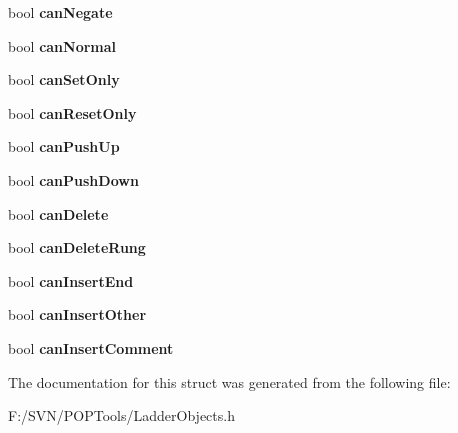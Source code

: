 \begin{DoxyCompactItemize}
\item 
\hypertarget{struct_ladder_context_aecede7dbc285e32120548c687ee4754b}{bool {\bfseries can\-Negate}}\label{struct_ladder_context_aecede7dbc285e32120548c687ee4754b}

\item 
\hypertarget{struct_ladder_context_a4fd95b615aab13842309a6d78422618d}{bool {\bfseries can\-Normal}}\label{struct_ladder_context_a4fd95b615aab13842309a6d78422618d}

\item 
\hypertarget{struct_ladder_context_a61ba9d2b55247b59fec2851dbceff11d}{bool {\bfseries can\-Set\-Only}}\label{struct_ladder_context_a61ba9d2b55247b59fec2851dbceff11d}

\item 
\hypertarget{struct_ladder_context_aaeda31d47fbcfb8c144e71c5dcc721e6}{bool {\bfseries can\-Reset\-Only}}\label{struct_ladder_context_aaeda31d47fbcfb8c144e71c5dcc721e6}

\item 
\hypertarget{struct_ladder_context_af8729a23430774a03c7c4be3aaacad68}{bool {\bfseries can\-Push\-Up}}\label{struct_ladder_context_af8729a23430774a03c7c4be3aaacad68}

\item 
\hypertarget{struct_ladder_context_a340a738f533cb7e24180bbd762c57239}{bool {\bfseries can\-Push\-Down}}\label{struct_ladder_context_a340a738f533cb7e24180bbd762c57239}

\item 
\hypertarget{struct_ladder_context_a32ac15238228f4ede02f7b07c83eb83e}{bool {\bfseries can\-Delete}}\label{struct_ladder_context_a32ac15238228f4ede02f7b07c83eb83e}

\item 
\hypertarget{struct_ladder_context_ab8d097fa1a3afa4b24264e4b5f682bdc}{bool {\bfseries can\-Delete\-Rung}}\label{struct_ladder_context_ab8d097fa1a3afa4b24264e4b5f682bdc}

\item 
\hypertarget{struct_ladder_context_a430ac7b219ae5df9630a3cb98750b943}{bool {\bfseries can\-Insert\-End}}\label{struct_ladder_context_a430ac7b219ae5df9630a3cb98750b943}

\item 
\hypertarget{struct_ladder_context_a9f2ec64de0e09b8fa9478cca28c61708}{bool {\bfseries can\-Insert\-Other}}\label{struct_ladder_context_a9f2ec64de0e09b8fa9478cca28c61708}

\item 
\hypertarget{struct_ladder_context_aa86f43c59776db56278771b6fc3a1397}{bool {\bfseries can\-Insert\-Comment}}\label{struct_ladder_context_aa86f43c59776db56278771b6fc3a1397}

\end{DoxyCompactItemize}


The documentation for this struct was generated from the following file\-:\begin{DoxyCompactItemize}
\item 
F\-:/\-S\-V\-N/\-P\-O\-P\-Tools/Ladder\-Objects.\-h\end{DoxyCompactItemize}
